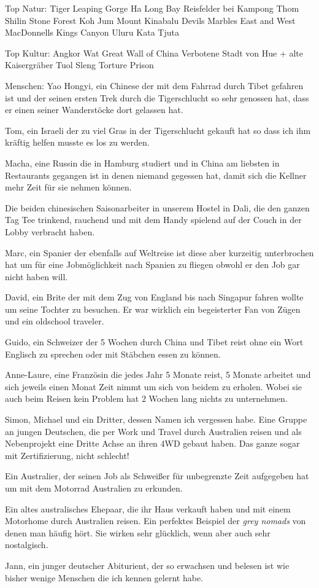\documentclass[11pt]{book}
\begin{document}
Top Natur:
Tiger Leaping Gorge
Ha Long Bay
Reisfelder bei Kampong Thom
Shilin Stone Forest
Koh Jum
Mount Kinabalu
Devils Marbles
East and West MacDonnells
Kings Canyon
Uluru
Kata Tjuta


Top Kultur:
Angkor Wat
Great Wall of China
Verbotene Stadt von Hue + alte Kaisergräber 
Tuol Sleng Torture Prison

Menschen:
Yao Hongyi, ein Chinese der mit dem Fahrrad durch Tibet gefahren ist und der seinen ersten Trek durch die Tigerschlucht so sehr 
genossen hat, dass er einen seiner Wanderstöcke dort gelassen hat.

Tom, ein Israeli der zu viel Gras in der Tigerschlucht gekauft hat so dass ich ihm kräftig helfen musste es los zu werden.

Macha, eine Russin die in Hamburg studiert und in China am liebsten in Restaurants gegangen ist in denen niemand gegessen hat, damit sich 
die Kellner mehr Zeit für sie nehmen können.

Die beiden chinesischen Saisonarbeiter in unserem Hostel in Dali, die den ganzen Tag Tee trinkend, rauchend und mit dem Handy spielend 
auf der Couch in der Lobby verbracht haben.

Marc, ein Spanier der ebenfalls auf Weltreise ist diese aber kurzeitig unterbrochen hat um für eine Jobmöglichkeit nach Spanien zu fliegen 
obwohl er den Job gar nicht haben will.

David, ein Brite der mit dem Zug von England bis nach Singapur fahren wollte um seine Tochter zu besuchen. Er war wirklich ein begeisterter
Fan von Zügen und ein oldschool traveler.

Guido, ein Schweizer der 5 Wochen durch China und Tibet reist ohne ein Wort Englisch zu sprechen oder mit Stäbchen essen zu können.

Anne-Laure, eine Französin die jedes Jahr 5 Monate reist, 5 Monate arbeitet und sich jeweils einen Monat Zeit nimmt um sich von beidem 
zu erholen. Wobei sie auch beim Reisen kein Problem hat 2 Wochen lang nichts zu unternehmen.

Simon, Michael und ein Dritter, dessen Namen ich vergessen habe. Eine Gruppe an jungen Deutschen, die per Work und Travel durch 
Australien reisen und als Nebenprojekt eine Dritte Achse an ihren 4WD gebaut haben. Das ganze sogar mit Zertifizierung, nicht schlecht!

Ein Australier, der seinen Job als Schweißer für unbegrenzte Zeit aufgegeben hat um mit dem Motorrad Australien zu erkunden.

Ein altes australisches Ehepaar, die ihr Haus verkauft haben und mit einem Motorhome durch Australien reisen. Ein perfektes 
Beispiel der \emph{grey nomads} von denen man häufig hört. Sie wirken sehr glücklich, wenn aber auch sehr nostalgisch.

Jann, ein junger deutscher Abiturient, der so erwachsen und belesen ist wie bisher wenige Menschen die ich kennen gelernt habe.
\end{document}
